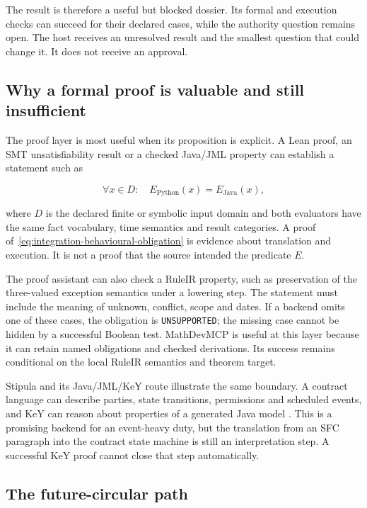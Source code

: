\documentclass[12pt,a4paper,oneside,openany]{book}
\begin{document}
The result is therefore a useful but blocked dossier. Its formal and execution
checks can succeed for their declared cases, while the authority
question remains open. The host receives an unresolved result and the smallest
question that could change it. It does not receive an approval.

\subsection{Why a formal proof is valuable and still insufficient}

The proof layer is most useful when its proposition is explicit. A Lean proof,
an SMT unsatisfiability result or a checked Java/JML property can establish a
statement such as

\begin{equation}
  \forall x\in D:\quad E_{\mathrm{Python}}(x)=E_{\mathrm{Java}}(x),
  \label{eq:integration-behavioural-obligation}
\end{equation}

where $D$ is the declared finite or symbolic input domain and both evaluators
have the same fact vocabulary, time semantics and result categories. A proof
of~\eqref{eq:integration-behavioural-obligation} is evidence about translation
and execution. It is not a proof that the source intended the predicate
$E$.

The proof assistant can also check a RuleIR property, such as preservation of
the three-valued exception semantics under a lowering step. The statement must
include the meaning of unknown, conflict, scope and dates. If a backend omits
one of these cases, the obligation is \texttt{UNSUPPORTED}; the missing case
cannot be hidden by a successful Boolean test. MathDevMCP is useful at this
layer because it can retain named obligations and checked derivations. Its
success remains conditional on the local RuleIR semantics and theorem target.

Stipula and its Java/JML/KeY route illustrate the same boundary. A contract
language can describe parties, state transitions, permissions and scheduled
events, and KeY can reason about properties of a generated Java model
\citep[secs.~3--6]{stipula2021}\citep[secs.~3--5]{stipulakey2025}. This is a
promising backend for an event-heavy duty, but the translation from an SFC
paragraph into the contract state machine is still an interpretation step. A
successful KeY proof cannot close that step automatically.

\subsection{The future-circular path}
\end{document}
